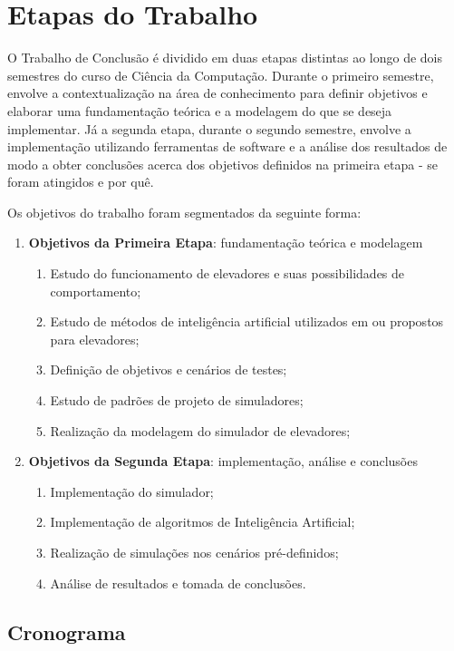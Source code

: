 \chapter{\label{chap:stages}Etapas do Trabalho}

O Trabalho de Conclusão é dividido em duas etapas distintas ao longo de dois
semestres do curso de Ciência da Computação. Durante o primeiro semestre,
envolve a contextualização na área de conhecimento para definir objetivos e
elaborar uma fundamentação teórica e a modelagem do que se deseja implementar.
Já a segunda etapa, durante o segundo semestre, envolve a implementação
utilizando ferramentas de software e a análise dos resultados de modo a obter
conclusões acerca dos objetivos definidos na primeira etapa - se foram atingidos
e por quê.

Os objetivos do trabalho foram segmentados da seguinte forma:

\begin{enumerate}
  \item \textbf{Objetivos da Primeira Etapa}: fundamentação teórica e modelagem
  \begin{enumerate}[label*=\arabic*.]
    \item Estudo do funcionamento de elevadores e suas possibilidades de
          comportamento;
    \item Estudo de métodos de inteligência artificial utilizados em ou
          propostos para elevadores;
    \item Definição de objetivos e cenários de testes;
    \item Estudo de padrões de projeto de simuladores;
    \item Realização da modelagem do simulador de elevadores;
  \end{enumerate}
  \item \textbf{Objetivos da Segunda Etapa}: implementação, análise e conclusões
  \begin{enumerate}[label*=\arabic*.]
    \item Implementação do simulador;
    \item Implementação de algoritmos de Inteligência Artificial;
    \item Realização de simulações nos cenários pré-definidos;
    \item Análise de resultados e tomada de conclusões.
  \end{enumerate}
\end{enumerate}

\section{\label{section:schedule}Cronograma}

